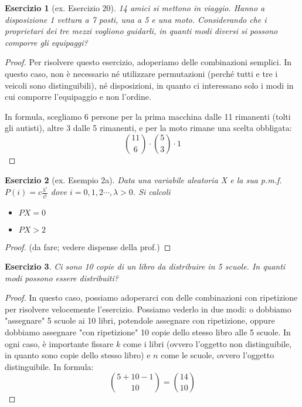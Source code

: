 \documentclass[12pt]{article}
\newtheorem{theorem}{Esercizio}
\begin{document}
\begin{theorem}[ex. Esercizio 20]
14 amici si mettono in viaggio. Hanno a disposizione 1 vettura a 7 posti, una a 5 e una moto. Considerando che i proprietari dei tre mezzi vogliono guidarli, in quanti modi diversi si possono comporre gli equipaggi?
\end{theorem}

\begin{proof}
Per risolvere questo esercizio, adoperiamo delle combinazioni semplici. In questo caso, non è necessario né utilizzare permutazioni (perché tutti e tre i veicoli sono distinguibili), né disposizioni, in quanto ci interessano solo i modi in cui comporre l'equipaggio e non l'ordine.

In formula, scegliamo 6 persone per la prima macchina dalle 11 rimanenti (tolti gli autisti), altre 3 dalle 5 rimanenti, e per la moto rimane una scelta obbligata:
$$
{11 \choose 6} \cdot {5 \choose 3} \cdot 1
$$
\end{proof}

\begin{theorem}[ex. Esempio 2a]
Data una variabile aleatoria X e la sua p.m.f. $P(i) = c \frac{\lambda^i}{i!}$ dove $i = 0, 1, 2 \cdots, \lambda > 0$. Si calcoli
\begin{itemize}
    \item $P{X=0}$
    \item $P{X>2}$
\end{itemize}
\end{theorem}

\begin{proof}
(da fare; vedere dispense della prof.)
\end{proof}

\begin{theorem}
Ci sono 10 copie di un libro da distribuire in 5 scuole. In quanti modi possono essere distribuiti?
\end{theorem}

\begin{proof}
In questo caso, possiamo adoperarci con delle combinazioni con ripetizione per risolvere velocemente l'esercizio. Possiamo vederlo in due modi: o dobbiamo "assegnare" 5 scuole ai 10 libri, potendole assegnare con ripetizione, oppure dobbiamo assegnare "con ripetizione" 10 copie dello stesso libro alle 5 scuole. In ogni caso, è importante fissare $k$ come i libri (ovvero l'oggetto non distinguibile, in quanto sono copie dello stesso libro) e $n$ come le scuole, ovvero l'oggetto distinguibile. In formula:
$$
{5 + 10 - 1 \choose 10} = {14 \choose 10}
$$
\end{proof}
\end{document}
